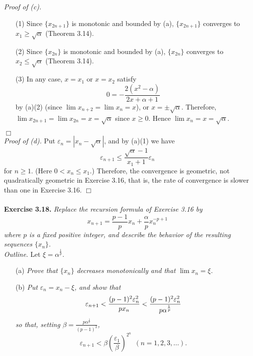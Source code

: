 \documentclass{article}
\begin{document}
\emph{Proof of (c).}
\begin{enumerate}
\item[(1)]
  Since $\{x_{2n+1}\}$ is monotonic and bounded by (a),
  $\{x_{2n+1}\}$ converges to $x_1 \geq \sqrt{\alpha}$ (Theorem 3.14).
\item[(2)]
  Since $\{x_{2n}\}$ is monotonic and bounded by (a),
  $\{x_{2n}\}$ converges to $x_2 \leq \sqrt{\alpha}$ (Theorem 3.14).
\item[(3)]
  In any case, $x = x_1$ or $x = x_2$ satisfy
  \[
    0 = -\frac{2(x^2 - \alpha)}{2x + \alpha + 1}
  \]
  by (a)(2)
  (since $\lim x_{n+2} = \lim x_n = x$),
  or $x = \pm \sqrt{\alpha}$.
  Therefore, $\lim x_{2n+1} = \lim x_{2n} = x = \sqrt{\alpha}$ since $x \geq 0$.
  Hence $\lim x_n = x = \sqrt{\alpha}$.
\end{enumerate}
$\Box$ \\

\emph{Proof of (d).}
Put $\varepsilon_n = |x_n - \sqrt{\alpha}|$, and by (a)(1) we have
$$\varepsilon_{n+1}
\leq \frac{\sqrt{\alpha} - 1}{x_1+1} \varepsilon_n$$
for $n \geq 1$. (Here $0 < x_n \leq x_1$.)
Therefore, the convergence is geometric, not quadratically geometric in Exercise 3.16,
that is, the rate of convergence is slower than one in Exercise 3.16.
$\Box$ \\\\






\textbf{Exercise 3.18.}
\emph{Replace the recursion formula of Exercise 3.16 by
$$x_{n+1} = \frac{p-1}{p} x_n + \frac{\alpha}{p} x_n^{-p+1}$$
where $p$ is a fixed positive integer,
and describe the behavior of the resulting sequences $\{x_n\}$.} \\

\emph{Outline.}
Let $\xi = \alpha^{\frac{1}{p}}$.
\begin{enumerate}
\item[(a)]
\emph{Prove that $\{x_n\}$ decreases monotonically and that
$\lim x_n = \xi$.}
\item[(b)]
\emph{Put $\varepsilon_n = x_n - \xi$, and show that
\[
  \varepsilon_{n+1}
  < \frac{(p-1)^2\varepsilon_n^2}{p x_n} \\
  < \frac{(p-1)^2\varepsilon_n^2}{p \alpha^{\frac{1}{p}}}
\]
so that, setting $\beta = \frac{p \alpha^{\frac{1}{p}}}{(p-1)^2}$,
$$\varepsilon_{n+1}
< \beta \left( \frac{\varepsilon_1}{\beta} \right)^{2^n} \:\: (n =1,2,3,\ldots).$$ } \\
\end{enumerate}
\end{document}
